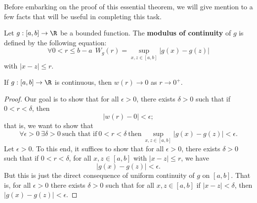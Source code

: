Before embarking on the proof of this essential theorem, we will give mention to a few facts that will be useful in completing this task. 

\begin{definition}
    Let \( g: [a,b] \to \R  \) be a bounded function. The \textbf{modulus of continuity} of \( g  \) is defined by the following equation:
    \[  \forall 0 < r \leq b - a \ \ {W}_{g}(r) = \sup_{x,z \in [a,b]} | g(x) - g(z) |  \]
    with \( | x - z  |  \leq r  \).
\end{definition}

\begin{prop}[Fact 1]\label{Fact 1}
    If \( g:[a,b] \to \R  \) is continuous, then \( w(r) \to 0  \) as \( r \to 0^{+}  \). 
\end{prop}
\begin{proof}
Our goal is to show that for all \( \epsilon > 0  \), there exists \( \delta > 0  \) such that if \( 0 < r < \delta  \), then 
\[  | w(r) - 0  |  < \epsilon; \]
that is, we want to show that 
\[  \forall \epsilon > 0 \ \exists \delta > 0 \ \text{such that if} \ 0 < r < \delta \ \text{then} \ \sup_{x,z \in [a,b]} | g(x) - g(z) |  < \epsilon. \]
Let \( \epsilon > 0 \). To this end, it suffices to show that for all \( \epsilon > 0  \), there exists \( \delta > 0  \) such that if \( 0 < r < \delta  \), for all \( x,z \in [a,b] \) with \( | x - z  |  \leq r  \), we have  
\[  |g(x) - g(z)|  < \epsilon. \]
But this is just the direct consequence of uniform continuity of \( g  \) on \( [a,b] \). That is, for all \( \epsilon > 0  \) there exists \( \delta > 0  \) such that for all \( x,z \in [a,b] \) if \( |  x - z  |  < \delta  \), then \( | g(x) - g(z) |  < \epsilon \). 
\end{proof}

